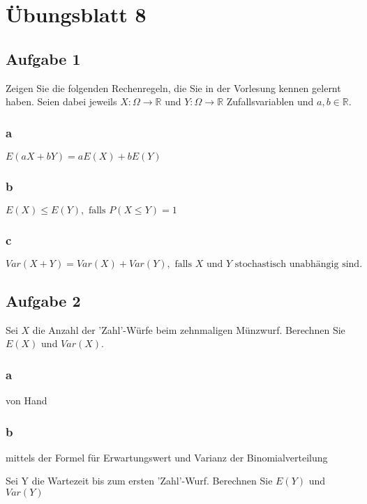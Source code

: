 \chapter{Übungsblatt 8}

\section{Aufgabe 1}

Zeigen Sie die folgenden Rechenregeln, die Sie in der Vorlesung kennen gelernt
haben. Seien dabei jeweils $X : \Omega \rightarrow \mathbb{R}$ und $Y : \Omega
    \rightarrow \mathbb{R}$ Zufallsvariablen und $a, b \in \mathbb{R}$.

\subsection{a}

$E(aX + bY) = aE(X) + bE(Y)$

\subsection{b}

$E(X) \leq E(Y), \text{ falls } P(X \leq Y) = 1$

\subsection{c}

$Var(X + Y) = Var(X) + Var(Y), \text{ falls } X \text{ und } Y \text{ stochastisch unabhängig sind}.$

\section{Aufgabe 2}

Sei $X$ die Anzahl der 'Zahl'-Würfe beim zehnmaligen Münzwurf. Berechnen Sie
$E(X)$ und $Var(X)$.

\subsection{a}
von Hand

\subsection{b}
mittels der Formel für Erwartungswert und Varianz der Binomialverteilung

Sei Y die Wartezeit bis zum ersten 'Zahl'-Wurf. Berechnen Sie $E(Y)$ und
$Var(Y)$

